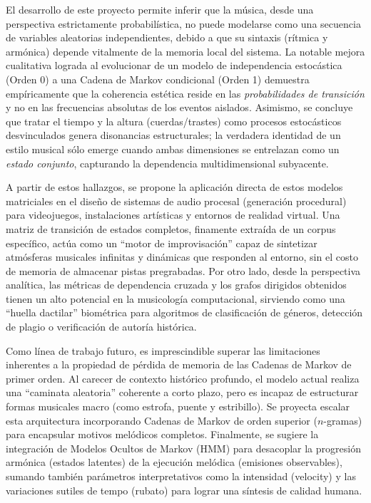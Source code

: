 \documentclass{article}
\theoremstyle{plain}
\theoremstyle{definition}
\begin{document}
El desarrollo de este proyecto permite inferir que la música, desde una perspectiva estrictamente probabilística, no puede modelarse como una secuencia de variables aleatorias independientes, debido a que su sintaxis (rítmica y armónica) depende vitalmente de la memoria local del sistema. La notable mejora cualitativa lograda al evolucionar de un modelo de independencia estocástica (Orden 0) a una Cadena de Markov condicional (Orden 1) demuestra empíricamente que la coherencia estética reside en las \textit{probabilidades de transición} y no en las frecuencias absolutas de los eventos aislados. Asimismo, se concluye que tratar el tiempo y la altura (cuerdas/trastes) como procesos estocásticos desvinculados genera disonancias estructurales; la verdadera identidad de un estilo musical sólo emerge cuando ambas dimensiones se entrelazan como un \textit{estado conjunto}, capturando la dependencia multidimensional subyacente.

A partir de estos hallazgos, se propone la aplicación directa de estos modelos matriciales en el diseño de sistemas de audio procesal (generación procedural) para videojuegos, instalaciones artísticas y entornos de realidad virtual. Una matriz de transición de estados completos, finamente extraída de un corpus específico, actúa como un ``motor de improvisación'' capaz de sintetizar atmósferas musicales infinitas y dinámicas que responden al entorno, sin el costo de memoria de almacenar pistas pregrabadas. Por otro lado, desde la perspectiva analítica, las métricas de dependencia cruzada y los grafos dirigidos obtenidos tienen un alto potencial en la musicología computacional, sirviendo como una ``huella dactilar'' biométrica para algoritmos de clasificación de géneros, detección de plagio o verificación de autoría histórica.

Como línea de trabajo futuro, es imprescindible superar las limitaciones inherentes a la propiedad de pérdida de memoria de las Cadenas de Markov de primer orden. Al carecer de contexto histórico profundo, el modelo actual realiza una ``caminata aleatoria'' coherente a corto plazo, pero es incapaz de estructurar formas musicales macro (como estrofa, puente y estribillo). Se proyecta escalar esta arquitectura incorporando Cadenas de Markov de orden superior ($n$-gramas) para encapsular motivos melódicos completos. Finalmente, se sugiere la integración de Modelos Ocultos de Markov (HMM) para desacoplar la progresión armónica (estados latentes) de la ejecución melódica (emisiones observables), sumando también parámetros interpretativos como la intensidad (velocity) y las variaciones sutiles de tempo (rubato) para lograr una síntesis de calidad humana.
\end{document}
